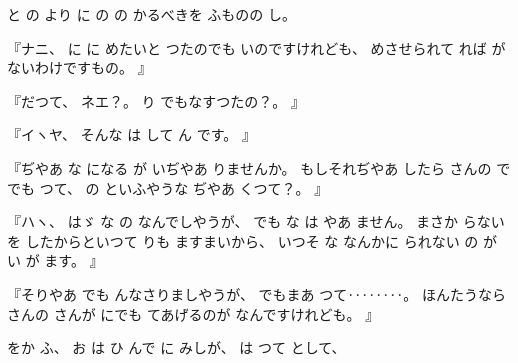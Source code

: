 %
と
の
より
に
の
の
かるべきを
ふものの
し。

%
『ナニ、
%
に
に
めたいと
つたのでも
いのですけれども、
%
めさせられて
れば
がないわけですもの。
』

%
『だつて、
%
ネエ？。
%
り
でもなすつたの？。
』

%
『イヽヤ、
%
そんな
は
して
ん
です。
』

%
『ぢやあ
な
になる
が
いぢやあ
りませんか。
%
もしそれぢやあ
したら
さんの
で
でも
つて、
%
の
といふやうな
ぢやあ
くつて？。
』

%
『ハヽ、
%
はゞ
な
の
なんでしやうが、
%
でも
な
は
やあ
ません。
%
まさか
らない
を
したからといつて
りも
ますまいから、
%
いつそ
な
なんかに
られない
の
が
い
が
ます。
』

%
『そりやあ
でも
んなさりましやうが、
%
でもまあ
つて‥‥‥‥。
%
ほんたうなら
さんの
さんが
にでも
てあげるのが
なんですけれども。
』

%
をか
ふ、
%
お
は
ひ
んで
に
みしが、
%
は
つて
として、

